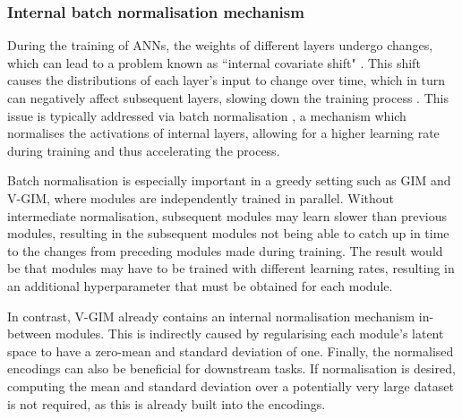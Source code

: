 
	
	\subsubsection{Internal batch normalisation mechanism} \label{cha:vgim_batch_norm}
		During the training of ANNs, the weights of different layers undergo changes, which can lead to a problem known as ``internal covariate shift" \citep{ioffeBatchNormalizationAccelerating2015a}. This shift causes the distributions of each layer's input to change over time, which in turn can negatively affect subsequent layers, slowing down the training process \citep{bjorckUnderstandingBatchNormalization2018, lecunEfficientBackProp1998}. This issue is typically addressed via batch normalisation \citep{santurkarHowDoesBatch2018, bjorckUnderstandingBatchNormalization2018}, a mechanism which normalises the activations of internal layers, allowing for a higher learning rate during training and thus accelerating the process.
			
		Batch normalisation is especially important in a greedy setting such as GIM and V-GIM, where modules are independently trained in parallel. Without intermediate normalisation, subsequent modules may learn slower than previous modules, resulting in the subsequent modules not being able to catch up in time to the changes from preceding modules made during training. The result would be that modules may have to be trained with different learning rates, resulting in an additional hyperparameter that must be obtained for each module.
		
		In contrast, V-GIM already contains an internal normalisation mechanism in-between modules. This is indirectly caused by regularising each module's latent space to have a zero-mean and standard deviation of one. Finally, the normalised encodings can also be beneficial for downstream tasks. If normalisation is desired, computing the mean and standard deviation over a potentially very large dataset is not required, as this is already built into the encodings.

